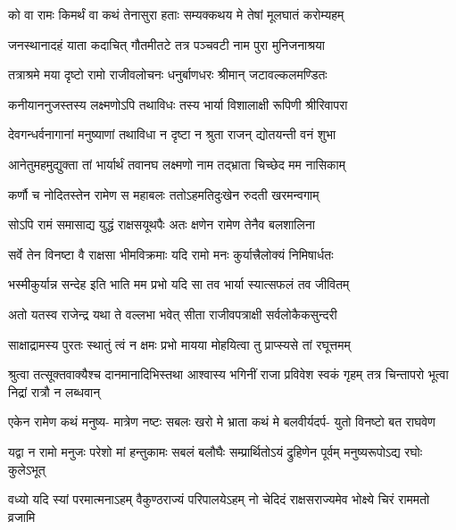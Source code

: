 
\twolineshloka
{को वा रामः किमर्थं वा कथं तेनासुरा हताः}
{सम्यक्कथय मे तेषां मूलघातं करोम्यहम्} %


\twolineshloka
{जनस्थानादहं याता कदाचित् गौतमीतटे}
{तत्र पञ्चवटी नाम पुरा मुनिजनाश्रया} %

\twolineshloka
{तत्राश्रमे मया दृष्टो रामो राजीवलोचनः}
{धनुर्बाणधरः श्रीमान् जटावल्कलमण्डितः} %

\twolineshloka
{कनीयाननुजस्तस्य लक्ष्मणोऽपि तथाविधः}
{तस्य भार्या विशालाक्षी रूपिणी श्रीरिवापरा} %

\twolineshloka
{देवगन्धर्वनागानां मनुष्याणां तथाविधा}
{न दृष्टा न श्रुता राजन् द्योतयन्ती वनं शुभा} %

\twolineshloka
{आनेतुमहमुद्युक्ता तां भार्यार्थं तवानघ}
{लक्ष्मणो नाम तद्भ्राता चिच्छेद मम नासिकाम्} %

\twolineshloka
{कर्णौ च नोदितस्तेन रामेण स महाबलः}
{ततोऽहमतिदुःखेन रुदती खरमन्वगाम्} %

\twolineshloka
{सोऽपि रामं समासाद्य युद्धं राक्षसयूथपैः}
{अतः क्षणेन रामेण तेनैव बलशालिना} %

\twolineshloka
{सर्वे तेन विनष्टा वै राक्षसा भीमविक्रमाः}
{यदि रामो मनः कुर्यात्त्रैलोक्यं निमिषार्धतः} %

\twolineshloka
{भस्मीकुर्यान्न सन्देह इति भाति मम प्रभो}
{यदि सा तव भार्या स्यात्सफलं तव जीवितम्} %

\twolineshloka
{अतो यतस्व राजेन्द्र यथा ते वल्लभा भवेत्}
{सीता राजीवपत्राक्षी सर्वलोकैकसुन्दरी} %

\twolineshloka
{साक्षाद्रामस्य पुरतः स्थातुं त्वं न क्षमः प्रभो}
{मायया मोहयित्वा तु प्राप्स्यसे तां रघूत्तमम्} %

\threelineshloka
{श्रुत्वा तत्सूक्तवाक्यैश्च दानमानादिभिस्तथा}
{आश्वास्य भगिनीं राजा प्रविवेश स्वकं गृहम्}
{तत्र चिन्तापरो भूत्वा निद्रां रात्रौ न लब्धवान्} %

\fourlineindentedshloka
{एकेन रामेण कथं मनुष्य-}
{मात्रेण नष्टः सबलः खरो मे}
{भ्राता कथं मे बलवीर्यदर्प-}
{युतो विनष्टो बत राघवेण} %

\fourlineindentedshloka
{यद्वा न रामो मनुजः परेशो}
{मां हन्तुकामः सबलं बलौघैः}
{सम्प्रार्थितोऽयं द्रुहिणेन पूर्वम्}
{मनुष्यरूपोऽद्य रघोः कुलेऽभूत्} %

\fourlineindentedshloka
{वध्यो यदि स्यां परमात्मनाऽहम्}
{वैकुण्ठराज्यं परिपालयेऽहम्}
{नो चेदिदं राक्षसराज्यमेव}
{भोक्ष्ये चिरं राममतो व्रजामि} %

